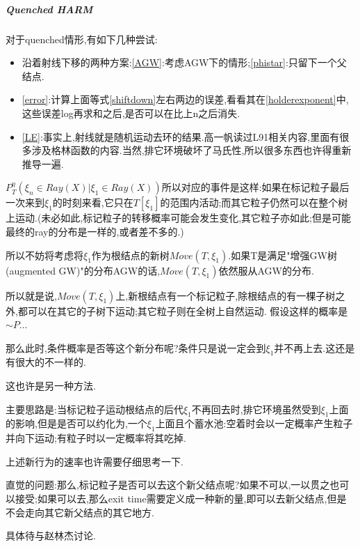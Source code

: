 \documentclass[a4paper,oneside]{ctexbook}
\begin{document}
				\subparagraph*{Quenched HARM}
				\quad

					对于quenched情形,有如下几种尝试:

					\begin{itemize}
						\label{trial}
						\item 沿着射线下移的两种方案:\ref{AGW}:考虑AGW下的情形;\ref{phistar}:只留下一个父结点.
						\item \ref{error}:计算上面等式\ref{shiftdown}左右两边的误差,看看其在\ref{holderexponent}中,这些误差log再求和之后,是否可以在比上n之后消失.
						\item \ref{LE}:事实上,射线就是随机运动去环的结果.高一帆读过L91相关内容,里面有很多涉及格林函数的内容.当然,排它环境破坏了马氏性,所以很多东西也许得重新推导一遍.
					\end{itemize}

					\begin{tri}[考虑AGW下的情形]
						\label{AGW}
						$P^{\eta}_T( \xi_n \in Ray(X) | \xi_1 \in Ray(X))$所以对应的事件是这样:如果在标记粒子最后一次来到$\xi_1$的时刻来看,它只在$T[\xi_1]$的范围内活动;而其它粒子仍然可以在整个树上运动.(未必如此,标记粒子的转移概率可能会发生变化,其它粒子亦如此;但是可能最终的ray的分布是一样的,或者差不多的.)

						所以不妨将考虑将$\xi_1$作为根结点的新树$Move(T,\xi_1)$.如果T是满足"增强GW树(augmented GW)"的分布AGW的话,$Move(T,\xi_1)$依然服从AGW的分布.

						所以就是说,$Move(T,\xi_1)$上,新根结点有一个标记粒子,除根结点的有一棵子树之外,都可以在其它的子树下运动;其它粒子则在全树上自然运动.
						假设这样的概率是$\sim{P}$...

						那么此时,条件概率是否等这个新分布呢?条件只是说一定会到$\xi_1$并不再上去.这还是有很大的不一样的.
					\end{tri}

					\begin{tri}
						\label{phistar}
						这也许是另一种方法.

						主要思路是:当标记粒子运动根结点的后代$\xi_1$不再回去时,排它环境虽然受到$\xi_1$上面的影响,但是是否可以约化为,一个$\xi_1$上面且个蓄水池:空着时会以一定概率产生粒子并向下运动;有粒子时以一定概率将其吃掉.

						上述新行为的速率也许需要仔细思考一下.

						直觉的问题:那么,标记粒子是否可以去这个新父结点呢?如果不可以,一以贯之也可以接受;如果可以去,那么exit time需要定义成一种新的量,即可以去新父结点,但是不会走向其它新父结点的其它地方.

						具体待与赵林杰讨论.
					\end{tri}
\end{document}
